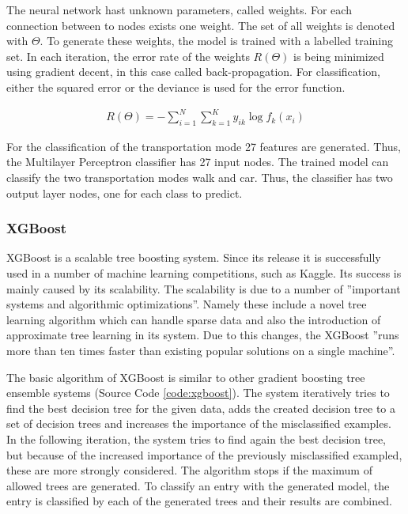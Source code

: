The neural network hast unknown parameters, called weights. For each connection between to nodes exists one weight. The set of all weights is denoted with $\Theta$. To generate these weights, the model is trained with a labelled training set. In each iteration, the error rate of the weights $R(\Theta)$ is being minimized using gradient decent, in this case called back-propagation. For classification, either the squared error or the deviance is used for the error function. \cite{hastie2005elements}

\begin{align}
    R(\Theta)=-\sum_{i=1}^N\sum_{k=1}^K y_{ik} \log f_k(x_i)
\end{align}{}

For the classification of the transportation mode 27 features are generated. Thus, the Multilayer Perceptron classifier has 27 input nodes. The trained model can classify the two transportation modes walk and car. Thus, the classifier has two output layer nodes, one for each class to predict. 


\subsubsection{XGBoost}
XGBoost is a scalable tree boosting system. Since its release it is successfully used in a number of machine learning competitions, such as Kaggle. Its success is mainly caused by its scalability. The scalability is due to a number of ''important systems and algorithmic optimizations''. Namely these include a novel tree learning algorithm which can handle sparse data and also the introduction of approximate tree learning in its system. Due to this changes, the XGBoost ''runs more than ten times faster than existing popular solutions on a single machine''.  \cite{chen2016xgboost}

The basic algorithm of XGBoost is similar to other gradient boosting tree ensemble systems (Source Code \ref{code:xgboost}). The system iteratively tries to find the best decision tree for the given data, adds the created decision tree to a set of decision trees and increases the importance of the misclassified examples. In the following iteration, the system tries to find again the best decision tree, but because of the increased importance of the previously misclassified exampled, these are more strongly considered. The algorithm stops if the maximum of allowed trees are generated. To classify an entry with the generated model, the entry is classified by each of the generated trees and their results are combined. \cite{chen2016xgboost}

